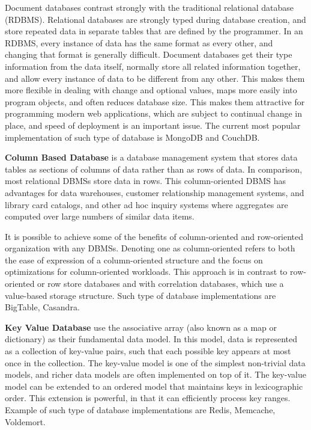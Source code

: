 Document databases contrast strongly with the traditional relational database (RDBMS). Relational databases are strongly typed during database creation, and store repeated data in separate tables that are defined by the programmer. In an RDBMS, every instance of data has the same format as every other, and changing that format is generally difficult. Document databases get their type information from the data itself, normally store all related information together, and allow every instance of data to be different from any other. This makes them more flexible in dealing with change and optional values, maps more easily into program objects, and often reduces database size. This makes them attractive for programming modern web applications, which are subject to continual change in place, and speed of deployment is an important issue. The current most popular implementation of such type of database is MongoDB and CouchDB.

\textbf{Column Based Database} is a database management system that stores data tables as sections of columns of data rather than as rows of data. In comparison, most relational DBMSs store data in rows. This column-oriented DBMS has advantages for data warehouses, customer relationship management systems, and library card catalogs, and other ad hoc inquiry systems where aggregates are computed over large numbers of similar data items.

It is possible to achieve some of the benefits of column-oriented and row-oriented organization with any DBMSs. Denoting one as column-oriented refers to both the ease of expression of a column-oriented structure and the focus on optimizations for column-oriented workloads. This approach is in contrast to row-oriented or row store databases and with correlation databases, which use a value-based storage structure. Such type of database implementations are BigTable, Casandra.

\textbf{Key Value Database} use the associative array (also known as a map or dictionary) as their fundamental data model. In this model, data is represented as a collection of key-value pairs, such that each possible key appears at most once in the collection. The key-value model is one of the simplest non-trivial data models, and richer data models are often implemented on top of it. The key-value model can be extended to an ordered model that maintains keys in lexicographic order. This extension is powerful, in that it can efficiently process key ranges. Example of such type of database implementations are Redis, Memcache, Voldemort.

